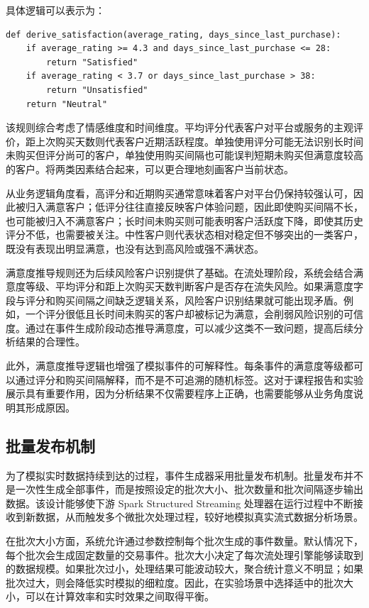 \documentclass[12pt,hyperref,a4paper,UTF8]{ctexart}
\begin{document}
具体逻辑可以表示为：

\begin{verbatim}
def derive_satisfaction(average_rating, days_since_last_purchase):
    if average_rating >= 4.3 and days_since_last_purchase <= 28:
        return "Satisfied"
    if average_rating < 3.7 or days_since_last_purchase > 38:
        return "Unsatisfied"
    return "Neutral"
\end{verbatim}

该规则综合考虑了情感维度和时间维度。平均评分代表客户对平台或服务的主观评价，距上次购买天数则代表客户近期活跃程度。单独使用评分可能无法识别长时间未购买但评分尚可的客户，单独使用购买间隔也可能误判短期未购买但满意度较高的客户。将两类因素结合起来，可以更合理地刻画客户当前状态。

从业务逻辑角度看，高评分和近期购买通常意味着客户对平台仍保持较强认可，因此被归入满意客户；低评分往往直接反映客户体验问题，因此即使购买间隔不长，也可能被归入不满意客户；长时间未购买则可能表明客户活跃度下降，即使其历史评分不低，也需要被关注。中性客户则代表状态相对稳定但不够突出的一类客户，既没有表现出明显满意，也没有达到高风险或强不满状态。

满意度推导规则还为后续风险客户识别提供了基础。在流处理阶段，系统会结合满意度等级、平均评分和距上次购买天数判断客户是否存在流失风险。如果满意度字段与评分和购买间隔之间缺乏逻辑关系，风险客户识别结果就可能出现矛盾。例如，一个评分很低且长时间未购买的客户却被标记为满意，会削弱风险识别的可信度。通过在事件生成阶段动态推导满意度，可以减少这类不一致问题，提高后续分析结果的合理性。

此外，满意度推导逻辑也增强了模拟事件的可解释性。每条事件的满意度等级都可以通过评分和购买间隔解释，而不是不可追溯的随机标签。这对于课程报告和实验展示具有重要作用，因为分析结果不仅需要程序上正确，也需要能够从业务角度说明其形成原因。

\subsection{批量发布机制}

为了模拟实时数据持续到达的过程，事件生成器采用批量发布机制。批量发布并不是一次性生成全部事件，而是按照设定的批次大小、批次数量和批次间隔逐步输出数据。该设计能够使下游 Spark Structured Streaming 处理器在运行过程中不断接收到新数据，从而触发多个微批次处理过程，较好地模拟真实流式数据分析场景。

在批次大小方面，系统允许通过参数控制每个批次生成的事件数量。默认情况下，每个批次会生成固定数量的交易事件。批次大小决定了每次流处理引擎能够读取到的数据规模。如果批次过小，处理结果可能波动较大，聚合统计意义不明显；如果批次过大，则会降低实时模拟的细粒度。因此，在实验场景中选择适中的批次大小，可以在计算效率和实时效果之间取得平衡。
\end{document}
